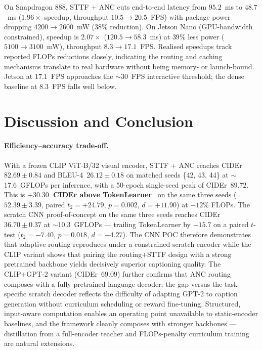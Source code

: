 \documentclass{article}
\begin{document}
On Snapdragon 888, STTF + ANC cuts end-to-end latency from $95.2$~ms to $48.7$~ms ($1.96\times$ speedup, throughput $10.5{\to}20.5$~FPS) with package power dropping $4200{\to}2600$~mW ($38\%$ reduction). On Jetson Nano (GPU-bandwidth constrained), speedup is $2.07\times$ ($120.5{\to}58.3$~ms) at $39\%$ less power ($5100{\to}3100$~mW), throughput $8.3{\to}17.1$~FPS. Realised speedups track reported FLOPs reductions closely, indicating the routing and caching mechanisms translate to real hardware without being memory- or launch-bound. Jetson at $17.1$~FPS approaches the $\sim$30~FPS interactive threshold; the dense baseline at $8.3$~FPS falls well below.

\section{Discussion and Conclusion}

\paragraph{Efficiency--accuracy trade-off.}
With a frozen CLIP ViT-B/32 visual encoder, STTF + ANC reaches CIDEr~$\mathbf{82.69 \pm 0.84}$ and BLEU-4~$\mathbf{26.12 \pm 0.18}$ on matched seeds \{42, 43, 44\} at $\sim$17.6~GFLOPs per inference, with a 50-epoch single-seed peak of CIDEr~$89.72$. This is \textbf{$+30.30$~CIDEr above TokenLearner}~\cite{ryoo2021tokenlearner} on the same three seeds ($52.39 \pm 3.39$, paired $t_{2}{=}{+}24.79$, $p{=}0.002$, $d{=}{+}11.90$) at $-12\%$ FLOPs. The scratch CNN proof-of-concept on the same three seeds reaches CIDEr $36.70 \pm 0.37$ at $\sim$10.3~GFLOPs --- trailing TokenLearner by $-15.7$ on a paired $t$-test ($t_{2}{=}{-}7.40$, $p{=}0.018$, $d{=}{-}4.27$). The CNN POC therefore demonstrates that adaptive routing reproduces under a constrained scratch encoder while the CLIP variant shows that pairing the routing+STTF design with a strong pretrained backbone yields decisively superior captioning quality. The CLIP+GPT-2 variant (CIDEr~$69.09$) further confirms that ANC routing composes with a fully pretrained language decoder; the gap versus the task-specific scratch decoder reflects the difficulty of adapting GPT-2 to caption generation without curriculum scheduling or reward fine-tuning. Structured, input-aware computation enables an operating point unavailable to static-encoder baselines, and the framework cleanly composes with stronger backbones --- distillation from a full-encoder teacher and FLOPs-penalty curriculum training are natural extensions.
\end{document}
